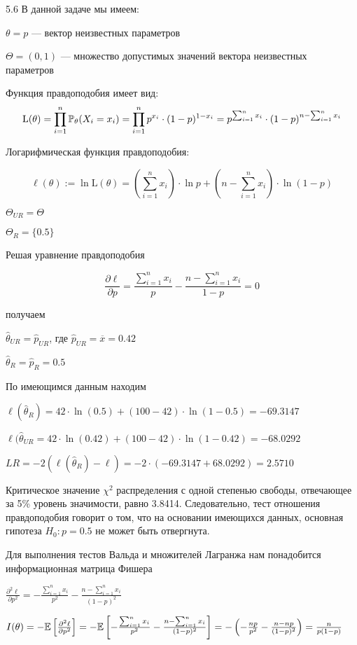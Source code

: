 \protect \hypertarget {soln:5.6}{}
\begin{solution}{{5.6}}
В данной задаче мы имеем:

$\theta = p$ — вектор неизвестных параметров

$\Theta = (0, 1)$ — множество допустимых значений вектора неизвестных параметров

Функция правдоподобия имеет вид:
\[\text{L}(\theta) = \prod_{i=1}^n \P_{\theta}(X_i = x_i) = \prod_{i=1}^n p^{x_i} \cdot (1-p)^{1-x_i} = p^{\sum_{i=1}^n x_i} \cdot (1-p)^{n - \sum_{i=1}^n x_i}\]

Логарифмическая функция правдоподобия:

\[\ell(\theta) := \ln \text{L}(\theta) = \left( \sum_{i=1}^n x_i \right) \cdot \ln p + \left(n - \sum_{i=1}^n x_i \right) \cdot \ln (1 - p)\]

$\Theta_{UR} = \Theta$

$\Theta_{R} = \{0.5\}$

Решая уравнение правдоподобия

\[\frac{\partial \ell}{\partial p} = \frac{\sum_{i=1}^n x_i}{p} - \frac{n - \sum_{i=1}^n x_i}{1 - p} = 0\]

получаем

$\hat{\theta}_{UR} = \hat{p}_{UR}$, где $\hat{p}_{UR} = \overline{x} = 0.42$

$\hat{\theta}_{R} = \hat{p}_{R} = 0.5$

По имеющимся данным находим

$\ell(\hat{\theta}_{R}) = 42 \cdot \ln(0.5) + (100-42) \cdot \ln(1-0.5) = -69.3147$

$\ell(\hat{\theta}_{UR} = 42 \cdot \ln(0.42) + (100-42) \cdot \ln(1-0.42) = -68.0292$

$LR = -2(\ell(\hat{\theta}_{R}) - \ell) = -2 \cdot (-69.3147 + 68.0292) = 2.5710$

Критическое значение $\chi^2$ распределения с одной степенью свободы, отвечающее за 5\% уровень значимости, равно 3.8414. Следовательно, тест отношения правдоподобия говорит о том, что на основании имеющихся данных, основная гипотеза $H_0: p = 0.5$ не может быть отвергнута.

Для выполнения тестов Вальда и множителей Лагранжа нам понадобится информационная матрица Фишера

$\frac{\partial^2 \ell}{\partial p^2} = - \frac{\sum_{i=1}^n x_i}{p^2} - \frac{n - \sum_{i=1}^n x_i}{(1 - p)^2}$

$I(\theta) = -\E\left[ \frac{\partial^2 \ell}{\partial p^2} \right] = -\E \left[ - \frac{\sum_{i=1}^n x_i}{p^2} - \frac{n - \sum_{i=1}^n x_i}{(1 - p)^2} \right] = -\left(-\frac{np}{p^2} - \frac{n - np}{(1-p)^2}\right) = \frac{n}{p(1-p)}$


\end{solution}
